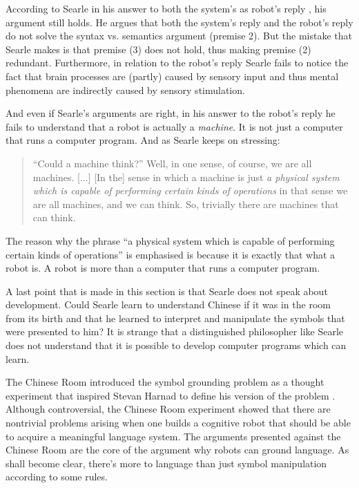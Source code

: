 According to Searle in his answer to both the system's as robot's reply \citep{searle:1984}, his argument still holds. He argues that both the system's reply and the robot's reply do not solve the syntax vs. semantics argument (premise 2). But the mistake that Searle makes is that premise (3) does not hold, thus making premise (2) redundant. Furthermore, in relation to the robot's reply Searle fails to notice the fact that brain processes are (partly) caused by sensory input and thus mental phenomena are indirectly caused by sensory stimulation.

And even if Searle's arguments are right, in his answer to the robot's reply he fails to understand that a robot is actually a {\em machine}. It is not just a computer that runs a computer program. And as Searle keeps on stressing:

\begin{quote}
``Could a machine think?'' Well, in one sense, of course, we are all machines. [...] [In the] sense in which a machine is just {\em a physical system which is capable of performing certain kinds of operations} in that sense we are all machines, and we can think. So, trivially there are machines that can think. \citep[35, my italics]{searle:1984}
\end{quote}

The reason why the phrase ``a physical system which is capable of performing certain kinds of operations'' is emphasised is because it is exactly that what a robot is. A robot is more than a computer that runs a computer program.

A last point that is made in this section is that Searle does not speak about development. Could Searle learn to understand Chinese if it was in the room from its birth and that he learned to interpret and manipulate the symbols that were presented to him? It is strange that a distinguished philosopher like Searle does not understand that it is possible to develop computer programs which can learn.

\bigskip\noindent{}The Chinese Room introduced the symbol grounding problem as a thought experiment that inspired Stevan Harnad to define his version of the problem \citep{harnad:1990}. Although controversial, the Chinese Room experiment showed that there are nontrivial problems arising when one builds a cognitive robot that should be able to acquire a meaningful language system. The arguments presented against the Chinese Room are the core of the argument why robots can ground language. As shall become clear, there's more to language than just symbol manipulation according to some rules.

